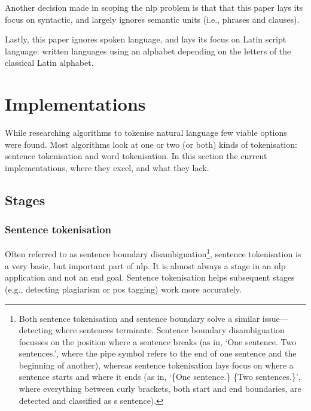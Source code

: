 Another decision made in scoping the \gls{nlp} problem is that that this
paper lays its focus on syntactic, and largely ignores semantic units
(i.e., phrases and clauses).

Lastly, this paper ignores spoken language, and lays its focus on Latin
script language: written languages using an alphabet depending on the
letters of the classical Latin alphabet.

\section{Implementations}\label{implementations}

While researching algorithms to tokenise natural language few viable
options were found. Most algorithms look at one or two (or both) kinds
of tokenisation: sentence tokenisation and word tokenisation. In this
section the current implementations, where they excel, and what they
lack.

\subsection{Stages}\label{stages}

\subsubsection{Sentence tokenisation}\label{sentence-tokenisation}

Often referred to as sentence boundary disambiguation\footnote{Both
  sentence tokenisation and sentence boundary solve a similar
  issue---detecting where sentences terminate. Sentence boundary
  disambiguation focusses on the position where a sentence breaks (as
  in, `One sentence.\textbar{} Two sentences.\textbar{}', where the pipe
  symbol refers to the end of one sentence and the beginning of
  another), whereas sentence tokenisation lays focus on where a sentence
  starts and where it ends (as in, `\{One sentence.\} \{Two
  sentences.\}', where everything between curly brackets, both start and
  end boundaries, are detected and classified as s sentence).}, sentence
tokenisation is a very basic, but important part of \gls{nlp}. It is
almost always a stage in an \gls{nlp} application and not an end goal.
Sentence tokenisation helps subsequent stages (e.g., detecting
plagiarism or \gls{pos} tagging) work more accurately.

